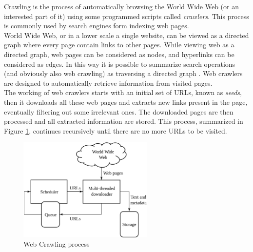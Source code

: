 Crawling is the process of automatically browsing the World Wide Web (or an interested part of it) using some programmed scripts called \textit{crawlers}. This process is commonly used by search engines form indexing web pages.\\
World Wide Web, or in a lower scale a single website, can be viewed as a directed graph where every page contain links to other pages. While viewing web as a directed graph, web pages can be considered as nodes, and hyperlinks can be considered as edges. In this way it is possible to summarize search operations (and obviously also web crawling) as traversing a directed graph \cite{article-web-crawling}. Web crawlers are designed to automatically retrieve information from visited pages.\\
The working of web crawlers starts with an initial set of URLs, known as \textit{seeds}, then it downloads all these web pages and extracts new links present in the page, eventually filtering out some irrelevant ones. The downloaded pages are then processed and all extracted information are stored. This process, summarized in Figure \ref{fig:web-crawler}, continues recursively until there are no more URLs to be visited. 

\begin{figure}[ht]
	\centering
	\includegraphics[width=0.6\textwidth]{figures/web-crawler.png}
	\caption{Web Crawling process}
	\label{fig:web-crawler}
\end{figure}






